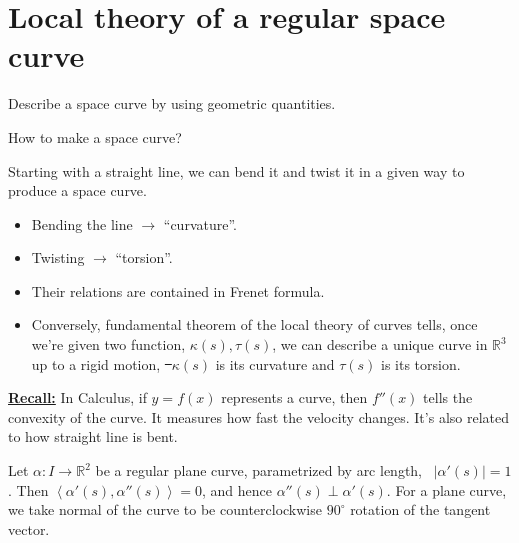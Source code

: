 \section{Local theory of a regular space curve}

\begin{goal}
    Describe a space curve by using geometric quantities.
\end{goal}

\begin{ques}
    How to make a space curve? 
\end{ques}
Starting with a straight line, we can bend it and twist it in a given way to
produce a space curve.
\begin{itemize}
    \item Bending the line \(\longrightarrow\) ``curvature''.
    \item Twisting \(\longrightarrow\) ``torsion''.
    \item Their relations are contained in Frenet formula.
    \item Conversely, fundamental theorem of the local theory of curves
        tells, once we're given two function, \(\kappa(s),\tau(s)\), we can
        describe a unique curve in \(\mathbb{R}^3\) up to a rigid motion,
        \st\ \(\kappa(s)\) is its curvature and \(\tau(s)\) is its torsion.
\end{itemize}

\noindent\underline{\bf Recall:} In Calculus, if \(y=f(x)\) represents a curve, then
\(f''(x)\) tells the convexity of the curve. It measures how fast the velocity
changes. It's also related to how straight line is bent.


Let \(\alpha\colon I\to \mathbb{R}^2\) be a regular plane curve, parametrized by
arc length, \ie\ \(|\alpha'(s)|=1\). Then \(\left<\alpha'(s),\alpha''(s)\right> =0\),
and hence \(\alpha''(s)\perp\alpha'(s)\). For a plane curve, we take normal of the
curve to be counterclockwise \(90^\circ\) rotation of the tangent vector.

